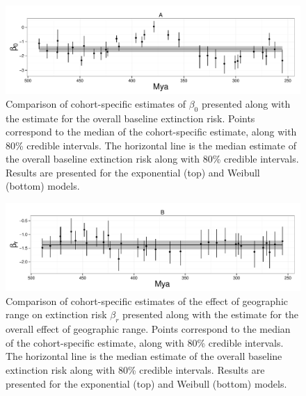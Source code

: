 \documentclass[12pt,letterpaper]{article}
\begin{document}
\begin{figure}[ht]
  \centering
  \includegraphics[height = 0.5\textheight,width=\textwidth,keepaspectratio=true]{figure/intercept_cohort}
  \caption{Comparison of cohort-specific estimates of \(\beta_{0}\) presented along with the estimate for the overall baseline extinction risk. Points correspond to the median of the cohort-specific estimate, along with 80\% credible intervals. The horizontal line is the median estimate of the overall baseline extinction risk along with 80\% credible intervals. Results are presented for the exponential (top) and Weibull (bottom) models.}
  \label{fig:cohort_intercept}
\end{figure}

\begin{figure}[ht]
  \centering
  \includegraphics[height = 0.5\textheight,width=\textwidth,keepaspectratio=true]{figure/range_cohort}
  \caption{Comparison of cohort-specific estimates of the effect of geographic range on extinction risk \(\beta_{r}\) presented along with the estimate for the overall effect of geographic range. Points correspond to the median of the cohort-specific estimate, along with 80\% credible intervals. The horizontal line is the median estimate of the overall baseline extinction risk along with 80\% credible intervals. Results are presented for the exponential (top) and Weibull (bottom) models.}
  \label{fig:cohort_range}
\end{figure}
\end{document}
